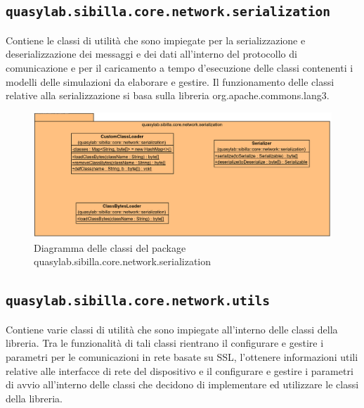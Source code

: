 \subsection{\texttt{quasylab.sibilla.core.network.serialization}} Contiene le classi di utilità che sono impiegate per la serializzazione e deserializzazione dei messaggi e dei dati all’interno del protocollo di comunicazione e per il caricamento a tempo d’esecuzione delle classi contenenti i modelli delle simulazioni da elaborare e gestire. Il funzionamento delle classi relative alla serializzazione si basa sulla libreria org.apache.commons.lang3.

\begin{figure}[H]
    \includegraphics[width=\linewidth]{images/quasylab.sibilla.core.network.serialization.png}
    \captionsetup{justification=centering}
    \caption{Diagramma delle classi del package quasylab.sibilla.core.network.serialization}
  \end{figure}

\subsection{\texttt{quasylab.sibilla.core.network.utils}} Contiene varie classi di utilità che sono impiegate all’interno delle classi della libreria. Tra le funzionalità di tali classi rientrano il configurare e gestire i parametri per le comunicazioni in rete basate su SSL, l’ottenere informazioni utili relative alle interfacce di rete del dispositivo e il configurare e gestire i parametri di avvio all’interno delle classi che decidono di implementare ed utilizzare le classi della libreria.

